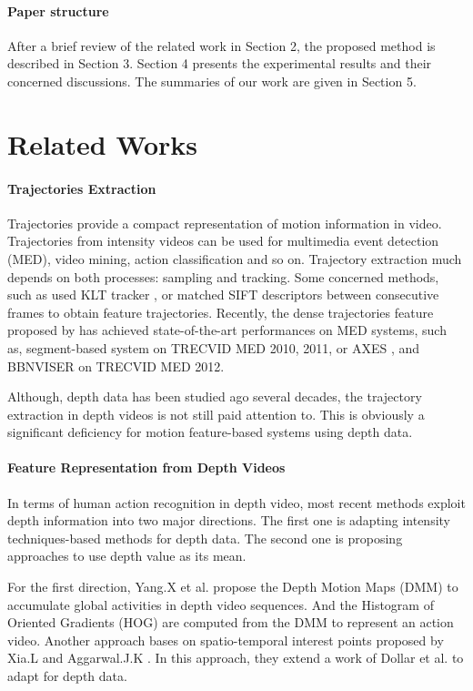 \documentclass[review]{elsarticle}
\begin{document}
\paragraph{Paper structure}After a brief review of the related work in Section 2, the proposed method is described in Section 3. Section 4 presents the experimental results and their concerned discussions. The summaries of our work are given in Section 5.

\section{Related Works}

\paragraph{Trajectories Extraction}
Trajectories provide a compact representation of motion information in video. Trajectories from intensity videos can be used for multimedia event detection (MED), video mining, action classification and so on. Trajectory extraction much depends on both processes: sampling and tracking. Some concerned methods, such as \cite{matikainen2009trajectons, messing2009activity} used KLT tracker \cite{lucas1981iterative}, or \cite{sun2009hierarchical} matched  SIFT descriptors between consecutive frames to obtain feature trajectories. Recently, the dense trajectories feature proposed by \cite{wang2011densetraj} has achieved state-of-the-art performances on MED systems, such as, segment-based system \cite{phan2014multimedia} on TRECVID MED 2010, 2011, or AXES \cite{oneata2012axes}, and BBNVISER \cite{natarajan2012bbn} on TRECVID MED 2012.

Although, depth data has been studied ago several decades, the trajectory extraction in depth videos is not still paid attention to. This is obviously a significant deficiency for motion feature-based systems using depth data.

\paragraph{Feature Representation from Depth Videos}
In terms of human action recognition in depth video, most recent methods exploit depth information into two major directions. The first one is adapting intensity techniques-based methods for depth data. The second one is proposing approaches to use depth value as its mean.

For the first direction, Yang.X et al. \cite{yang2012recognizing} propose the Depth Motion Maps (DMM) to accumulate global activities in depth video sequences. And the Histogram of Oriented Gradients (HOG) are computed from the DMM to represent an action video. Another approach bases on spatio-temporal interest points proposed by Xia.L and Aggarwal.J.K \cite{xia2013spatio}. In this approach, they extend a work of Dollar et al. \cite{dollar2005behavior} to adapt for depth data.
\end{document}
